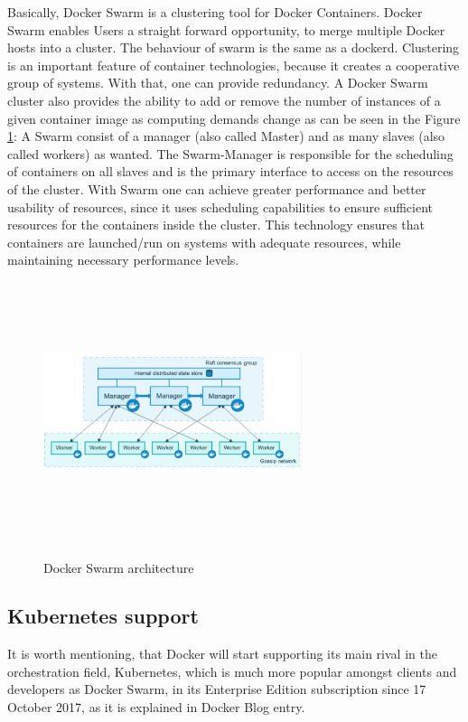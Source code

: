 Basically, Docker Swarm is a clustering tool for Docker Containers.
Docker Swarm enables Users a straight forward opportunity,
to merge multiple Docker hosts into a cluster\cite{DockerSwarmDefinition}.
The behaviour of swarm is the same as a dockerd.
Clustering is an important feature of container technologies,
because it creates a cooperative group of systems.
With that, one can provide redundancy.
A Docker Swarm cluster also provides the
ability to add or remove the number of instances of a given container
image as computing demands change
as can be seen in the Figure \ref{fig:DockerSwarmPic}:
A Swarm consist of a manager (also called Master) and
as many slaves (also called workers) as wanted.
The Swarm-Manager is responsible for the scheduling
of containers on all slaves and is the primary
interface to access on the resources of the cluster\cite{DockerSwarmKeyConcepts}.
With Swarm one can achieve greater performance and
better usability of resources, since it uses
scheduling capabilities to ensure sufficient resources for
the containers inside the cluster. This technology ensures that containers
are launched/run on systems with adequate resources, while maintaining
necessary performance levels\cite{DockerSwarmHowNodesWork}.

\begin{figure}
\includegraphics[height=3in, width=3in]{DockerSwarm}
\caption{Docker Swarm architecture}
\cite{DockerSwarmPic}
\label{fig:DockerSwarmPic}
\end{figure}

\subsection{Kubernetes support}

It is worth mentioning,
that Docker will start
supporting its main rival in the orchestration field, Kubernetes,
which is much more popular amongst clients and developers as Docker Swarm,
in its Enterprise Edition subscription since 17 October 2017,
as it is explained in Docker Blog entry\cite{DockerKubernetesSupport}.

